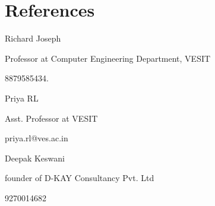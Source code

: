 \documentclass[margin, 10pt]{res} %
\begin{document}
\section{References}
\begin{minipage}[b]{0.33333\textwidth}
\raggedright
Richard Joseph \par
 Professor at Computer Engineering Department, VESIT \par
 8879585434. 
\end{minipage}%
\begin{minipage}[b]{0.33333\textwidth}
\centering
Priya RL \par
Asst. Professor at VESIT \par
priya.rl@ves.ac.in
\end{minipage}%
\begin{minipage}[b]{0.33333\textwidth}
\raggedleft
Deepak Keswani \par
 founder of D-KAY Consultancy Pvt. Ltd  \par
9270014682 
\end{minipage}
\end{document}
